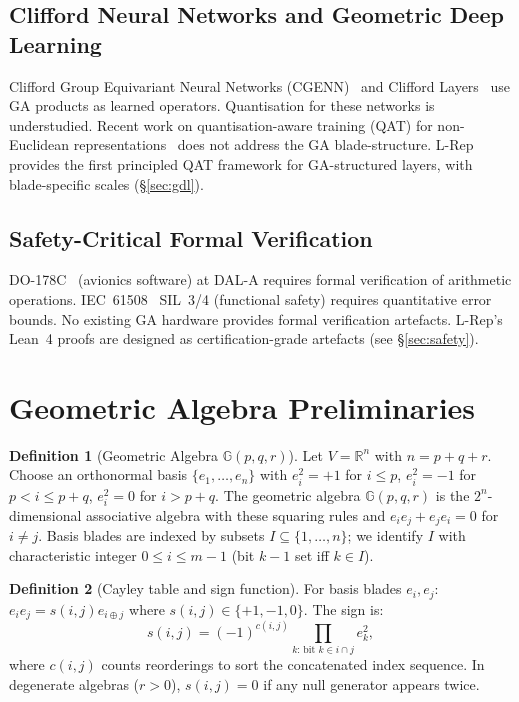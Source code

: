 \documentclass[11pt,a4paper]{article}
\theoremstyle{definition}
\newtheorem{definition}{Definition}[section]
\theoremstyle{plain}
\theoremstyle{remark}
\newcommand{\GA}{\mathbb{G}}
\newcommand{\reals}{\mathbb{R}}
\begin{document}
\subsection{Clifford Neural Networks and Geometric Deep Learning}

Clifford Group Equivariant Neural Networks (CGENN)~\cite{ruhe2023} and
Clifford Layers~\cite{brandstetter2023} use GA products as learned operators.
Quantisation for these networks is understudied.
Recent work on quantisation-aware training (QAT) for non-Euclidean
representations~\cite{lou2020} does not address the GA blade-structure.
L-Rep provides the first principled QAT framework for GA-structured layers,
with blade-specific scales (\S\ref{sec:gdl}).

\subsection{Safety-Critical Formal Verification}

DO-178C~\cite{do178c} (avionics software) at DAL-A requires
formal verification of arithmetic operations.
IEC~61508~\cite{iec61508} SIL~3/4 (functional safety) requires
quantitative error bounds.
No existing GA hardware provides formal verification artefacts.
L-Rep's Lean~4 proofs are designed as certification-grade artefacts
(see \S\ref{sec:safety}).

\section{Geometric Algebra Preliminaries}
\label{sec:prelim}

\begin{definition}[Geometric Algebra $\GA(p,q,r)$]
Let $V=\reals^n$ with $n=p+q+r$.
Choose an orthonormal basis $\{e_1,\ldots,e_n\}$ with $e_i^2=+1$ for
$i\le p$, $e_i^2=-1$ for $p<i\le p+q$, $e_i^2=0$ for $i>p+q$.
The geometric algebra $\GA(p,q,r)$ is the $2^n$-dimensional associative
algebra with these squaring rules and $e_ie_j+e_je_i=0$ for $i\ne j$.
Basis blades are indexed by subsets $I\subseteq\{1,\ldots,n\}$; we
identify $I$ with characteristic integer $0\le i\le m-1$ (bit $k-1$ set
iff $k\in I$).
\end{definition}

\begin{definition}[Cayley table and sign function]
\label{def:cayley}
For basis blades $e_i,e_j$: $e_ie_j=s(i,j)e_{i\oplus j}$ where
$s(i,j)\in\{+1,-1,0\}$.
The sign is:
\begin{equation}\label{eq:sign}
  s(i,j) = (-1)^{c(i,j)} \prod_{k:\,\text{bit }k\in i\cap j} e_k^2,
\end{equation}
where $c(i,j)$ counts reorderings to sort the concatenated index sequence.
In degenerate algebras ($r>0$), $s(i,j)=0$ if any null generator appears
twice.
\end{definition}
\end{document}
